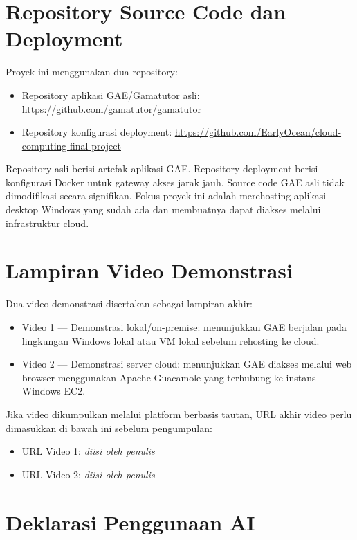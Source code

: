 \documentclass[conference]{IEEEtran}
\begin{document}
\section{Repository Source Code dan Deployment}

Proyek ini menggunakan dua repository:

\begin{itemize}
    \item Repository aplikasi GAE/Gamatutor asli: \url{https://github.com/gamatutor/gamatutor}
    \item Repository konfigurasi deployment: \url{https://github.com/EarlyOcean/cloud-computing-final-project}
\end{itemize}

Repository asli berisi artefak aplikasi GAE. Repository deployment berisi konfigurasi Docker untuk gateway akses jarak jauh. Source code GAE asli tidak dimodifikasi secara signifikan. Fokus proyek ini adalah merehosting aplikasi desktop Windows yang sudah ada dan membuatnya dapat diakses melalui infrastruktur cloud.

\section{Lampiran Video Demonstrasi}

Dua video demonstrasi disertakan sebagai lampiran akhir:

\begin{itemize}
    \item Video 1 --- Demonstrasi lokal/on-premise: menunjukkan GAE berjalan pada lingkungan Windows lokal atau VM lokal sebelum rehosting ke cloud.
    \item Video 2 --- Demonstrasi server cloud: menunjukkan GAE diakses melalui web browser menggunakan Apache Guacamole yang terhubung ke instans Windows EC2.
\end{itemize}

Jika video dikumpulkan melalui platform berbasis tautan, URL akhir video perlu dimasukkan di bawah ini sebelum pengumpulan:

\begin{itemize}
    \item URL Video 1: \textit{diisi oleh penulis}
    \item URL Video 2: \textit{diisi oleh penulis}
\end{itemize}

\section{Deklarasi Penggunaan AI}
\end{document}
